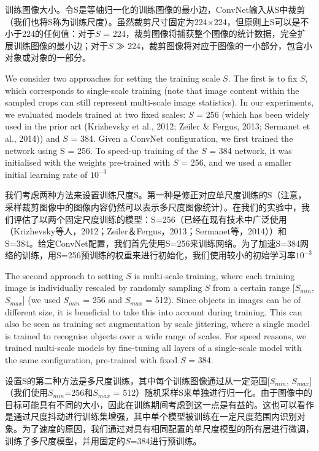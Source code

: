 \documentclass[12pt,a4paper,UTF8,twoside]{book}
\begin{document}
训练图像大小。令S是等轴归一化的训练图像的最小边，ConvNet输入从S中裁剪（我们也将S称为训练尺度）。虽然裁剪尺寸固定为224×224，但原则上S可以是不小于224的任何值：对于\(S\) = 224，裁剪图像将捕获整个图像的统计数据，完全扩展训练图像的最小边；对于\(S\) ≫ 224，裁剪图像将对应于图像的一小部分，包含小对象或对象的一部分。

We consider two approaches for setting the training scale \(S\). The first is to fix \(S\), which corresponds to single-scale training (note that image content within the sampled crops can still represent multi-scale image statistics). In our experiments, we evaluated models trained at two fixed scales: \(S\) = 256 (which has been widely used in the prior art (Krizhevsky et al., 2012; Zeiler \& Fergus, 2013; Sermanet et al., 2014)) and \(S\) = 384. Given a ConvNet configuration, we first trained the network using S = 256. To speed-up training of the \(S\) = 384 network, it was initialised with the weights pre-trained with \(S\) = 256, and we used a smaller initial learning rate of \(10^{-3}\)

我们考虑两种方法来设置训练尺度S。第一种是修正对应单尺度训练的S（注意，采样裁剪图像中的图像内容仍然可以表示多尺度图像统计）。在我们的实验中，我们评估了以两个固定尺度训练的模型：S=256（已经在现有技术中广泛使用（Krizhevsky等人，2012；Zeiler＆Fergus，2013；Sermanet等，2014））和S=384。给定ConvNet配置，我们首先使用S=256来训练网络。为了加速S=384网络的训练，用S=256预训练的权重来进行初始化，我们使用较小的初始学习率\(10^{-3}\)

The second approach to setting \(S\) is multi-scale training, where each training image is individually rescaled by randomly sampling \(S\) from a certain range {[}\(S_{min}\), \(S_{max}\){]} (we used \(S_{min}\) = 256 and \(S_{max}\) = 512). Since objects in images can be of different size, it is beneficial to take this into account during training. This can also be seen as training set augmentation by scale jittering, where a single model is trained to recognise objects over a wide range of scales. For speed reasons, we trained multi-scale models by fine-tuning all layers of a single-scale model with the same configuration, pre-trained with fixed \(S\) = 384.

设置S的第二种方法是多尺度训练，其中每个训练图像通过从一定范围{[}\(S_{min}\), \(S_{max}\){]}（我们使用\(S_{min}\)=256和\(S_{max}\) = 512）随机采样S来单独进行归一化。由于图像中的目标可能具有不同的大小，因此在训练期间考虑到这一点是有益的。这也可以看作是通过尺度抖动进行训练集增强，其中单个模型被训练在一定尺度范围内识别对象。为了速度的原因，我们通过对具有相同配置的单尺度模型的所有层进行微调，训练了多尺度模型，并用固定的\(S\)=384进行预训练。
\end{document}
